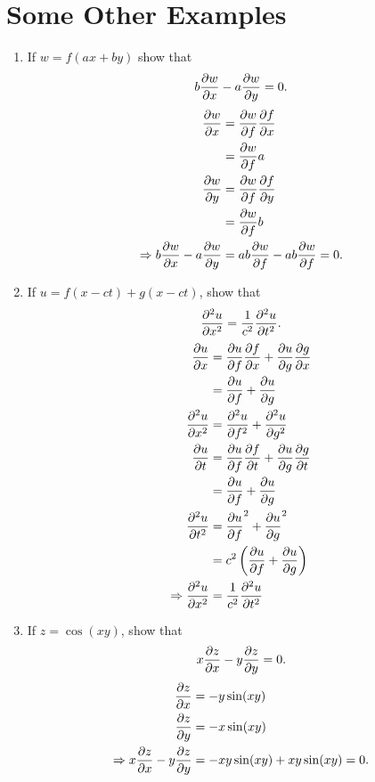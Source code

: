 \documentclass{article}
\begin{document}
\section{Some Other Examples}

\begin{enumerate}
	\item{If $w = f(ax+by)$ show that 
		\begin{equation*}
			b \pdv{w}{x} - a \pdv{w}{y} = 0.
		\end{equation*}		
		\begin{align*}
			\pdv{w}{x} &= \pdv{w}{f} \pdv{f}{x} \\
			&= \pdv{w}{f} a \\
			\pdv{w}{y} &= \pdv{w}{f} \pdv{f}{y} \\
			&= \pdv{w}{f} b \\
			\Rightarrow b \pdv{w}{x} - a \pdv{w}{y} &= a b \pdv{w}{f} - a b \pdv{w}{f} = 0.
		\end{align*}			
	}
	\item{If $u = f(x-ct) + g(x - ct)$, show that 
		\begin{equation*}
			\pdv[2]{u}{x} = \frac{1}{c^2} \pdv[2]{u}{t} .
		\end{equation*}
		\begin{align*}
			\pdv{u}{x} &= \pdv{u}{f} \pdv{f}{x} + \pdv{u}{g} \pdv{g}{x} \\
			&= \pdv{u}{f} + \pdv{u}{g} \\
			\pdv[2]{u}{x} &= \pdv[2]{u}{f} + \pdv[2]{u}{g} \\
			\pdv{u}{t} &= \pdv{u}{f} \pdv{f}{t} + \pdv{u}{g} \pdv{g}{t} \\
			&= \pdv{u}{f} (-c) + \pdv{u}{g} (c) \\
			\pdv[2]{u}{t} &=\pdv{u}{f} (-c)^2 + \pdv{u}{g} (c)^2 \\
			&= c^2 \left( \pdv{u}{f} + \pdv{u}{g}\right) \\
			\Rightarrow \pdv[2]{u}{x} &= \frac{1}{c^2} \pdv[2]{u}{t}
		\end{align*}
	}
	\item{If $z = \cos (xy)$, show that 
		\begin{equation*}
			x \pdv{z}{x} - y \pdv{z}{y} = 0 .
		\end{equation*}
		\begin{align*}
			\pdv{z}{x} &= -y \sin (xy) \\
			\pdv{z}{y} &= -x \sin (xy) \\
			\Rightarrow x \pdv{z}{x} - y \pdv{z}{y} &= -xy \sin (xy) + xy \sin (xy) = 0 .

\end{align*}}
\end{enumerate}
\end{document}
